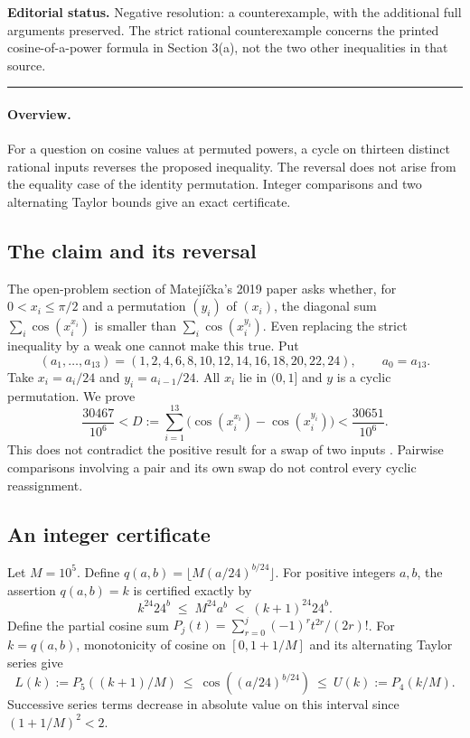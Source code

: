 \documentclass[11pt,a4paper]{article}
\begin{document}
\noindent\textbf{Editorial status.} Negative resolution: a counterexample, with the additional full arguments preserved. The strict rational counterexample concerns the printed cosine-of-a-power formula in Section 3(a), not the two other inequalities in that source.

\smallskip\hrule\medskip



\begingroup

\setcounter{equation}{0}
\renewcommand{\theequation}{\thesection.\arabic{equation}}
\renewcommand{\theHequation}{R22M.\arabic{equation}}
\paragraph{Overview.}
For a question on cosine values at permuted powers, a cycle on thirteen distinct rational inputs reverses the proposed inequality. The reversal does not arise from the equality case of the identity permutation. Integer comparisons and two alternating Taylor bounds give an exact certificate.


\subsection*{The claim and its reversal}
The open-problem section of Matej\'i\v{c}ka's 2019 paper \cite[\S3(a)]{R22M:M19} asks whether, for $0<x_i\le\pi/2$ and a permutation $(y_i)$ of $(x_i)$, the diagonal sum $\sum_i\cos(x_i^{x_i})$ is smaller than $\sum_i\cos(x_i^{y_i})$. Even replacing the strict inequality by a weak one cannot make this true.
Put
\[
(a_1,\dots,a_{13})=(1,2,4,6,8,10,12,14,16,18,20,22,24),
\qquad a_0=a_{13}.
\]
Take $x_i=a_i/24$ and $y_i=a_{i-1}/24$. All $x_i$ lie in $(0,1]$ and $y$ is a cyclic permutation. We prove
\[
\frac{30467}{10^6}<
D:=\sum_{i=1}^{13}\bigl(\cos(x_i^{x_i})-\cos(x_i^{y_i})\bigr)
<\frac{30651}{10^6}.
\]
This does not contradict the positive result for a swap of two inputs \cite{R22M:M20}. Pairwise comparisons involving a pair and its own swap do not control every cyclic reassignment.

\subsection*{An integer certificate}
Let $M=10^5$. Define $q(a,b)=\lfloor M(a/24)^{b/24}\rfloor$. For positive integers $a,b$, the assertion $q(a,b)=k$ is certified exactly by
\[
 k^{24}24^b\;\le\; M^{24}a^b\;<\;(k+1)^{24}24^b.
\]
Define the partial cosine sum $P_j(t)=\sum_{r=0}^j (-1)^r t^{2r}/(2r)!$. For $k=q(a,b)$, monotonicity of cosine on $[0,1+1/M]$ and its alternating Taylor series give
\[
 L(k):=P_5((k+1)/M)\ \le\ \cos((a/24)^{b/24})\ \le\ U(k):=P_4(k/M).
\]
Successive series terms decrease in absolute value on this interval since $(1+1/M)^2<2$.
\end{document}

